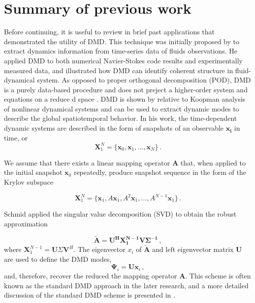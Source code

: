 \section{Summary of previous work}
Before continuing, it is useful to review in brief past applications that demonstrated the utility of DMD.
This technique was initially proposed by \citet{schmid_dynamic_2010}\cite{schmid_applications_2011} to extract dynamics information from time-series data of fluids observations.
He applied DMD to both numerical Navier-Stokes code results and experimentally measured data, and illustrated how DMD can identify coherent structure in fluid-dynamical system.
As opposed to proper orthogonal decomposition (POD)\cite{lumley2007stochastic}, DMD is a purely data-based procedure and does not preject a higher-order system and equations on a reduce d space . 
DMD is shown by relative to Koopman analysis\cite{lasota2013chaos,mezic2005spectral} of nonlinear dynamical systems and can be used to extract dynamic modes to describe the global spatiotemporal behavior.
In his work, the time-dependent dynamic systems are described in the form of snapshots of an observable $\mathbf{x_i}$ in time, or
\begin{equation}
 \mathbf{X}^{N}_1 = \{\mathbf{x}_0, \mathbf{x}_1, \ldots, \mathbf{x}_{N} \} \, .
 \label{eq:snap_matrix}
\end{equation}

We assume that there exists a linear mapping operator $\mathbf{A}$ that, when applied to the initial snapshot $\mathbf{x}_0$ repeatedly, produce snapshot sequence  in the form of the Krylov subspace 

\begin{equation}
 \mathbf{X}^{N}_1 = \{\mathbf{x}_1,A\mathbf{x}_1,A^2\mathbf{x}_1,…,A^{N-1}\mathbf{x}_1 \} \, .
 \label{eq:Krylov_seq}
\end{equation}

Schmid applied the singular value decomposition (SVD) to obtain the robust approximation

\begin{equation}
\mathbf{\tilde{A}} = \mathbf{U^H X_1^{N-1}V\Sigma^{-1}} \, ,
 \label{eq:stanard_DMD}
\end{equation}
where $\mathbf{X}_1^{N-1} = \mathbf{U}\Sigma \mathbf{V}^H$. 
The eigenvector $x_i$ of $\mathbf{\tilde{A}}$ and left eigenvector matrix $\mathbf{U}$ are used to define the DMD modes, 
\begin{equation}
\mathbf{\mathbf{\Psi}}_i = \mathbf{U} \mathbf{x}_i \, ,
 \label{eq:dyanmic_modes}
\end{equation}
and, therefore, recover the reduced the mapping operator $\mathbf{A}$.
This scheme is often known as the standard DMD approach in the later research\cite{tu_dynamic_2014}, and a more detailed discussion of the standard DMD scheme is presented in .   

